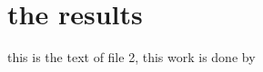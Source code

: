 %

\chapter{the results}
\label{ch:results}

this is the text of file 2, this work is done by \cite{Qiu:2005:RDG:1046640.1046665}

%